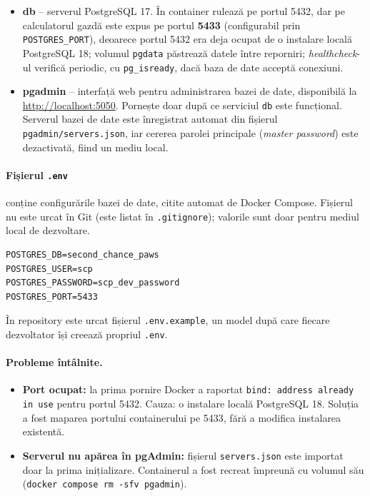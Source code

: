 \documentclass[11pt,a4paper]{article}
\begin{document}
\begin{itemize}
  \item \textbf{db} -- serverul PostgreSQL 17. În container rulează pe portul 5432, dar pe
        calculatorul gazdă este expus pe portul \textbf{5433} (configurabil prin \texttt{POSTGRES\_PORT}),
        deoarece portul 5432 era deja ocupat de o instalare locală PostgreSQL 18;
        volumul \texttt{pgdata} păstrează datele între reporniri; \emph{healthcheck}-ul
        verifică periodic, cu \texttt{pg\_isready}, dacă baza de date acceptă conexiuni.
  \item \textbf{pgadmin} -- interfață web pentru administrarea bazei de date, disponibilă la
        \url{http://localhost:5050}. Pornește doar după ce serviciul \texttt{db} este funcțional.
        Serverul bazei de date este înregistrat automat din fișierul \texttt{pgadmin/servers.json},
        iar cererea parolei principale (\emph{master password}) este dezactivată, fiind un mediu local.
\end{itemize}

\paragraph{Fișierul \texttt{.env}} conține configurările bazei de date, citite automat de
Docker Compose. Fișierul nu este urcat în Git (este listat în \texttt{.gitignore});
valorile sunt doar pentru mediul local de dezvoltare.
\begin{lstlisting}
POSTGRES_DB=second_chance_paws
POSTGRES_USER=scp
POSTGRES_PASSWORD=scp_dev_password
POSTGRES_PORT=5433
\end{lstlisting}

În repository este urcat fișierul \texttt{.env.example}, un model după care fiecare
dezvoltator își creează propriul \texttt{.env}.

\paragraph{Probleme întâlnite.}
\begin{itemize}
  \item \textbf{Port ocupat:} la prima pornire Docker a raportat
        \texttt{bind: address already in use} pentru portul 5432. Cauza: o instalare locală
        PostgreSQL 18. Soluția a fost maparea portului containerului pe 5433, fără a modifica
        instalarea existentă.
  \item \textbf{Serverul nu apărea în pgAdmin:} fișierul \texttt{servers.json} este importat doar
        la prima inițializare. Containerul a fost recreat împreună cu volumul său
        (\texttt{docker compose rm -sfv pgadmin}).
\end{itemize}
\end{document}
